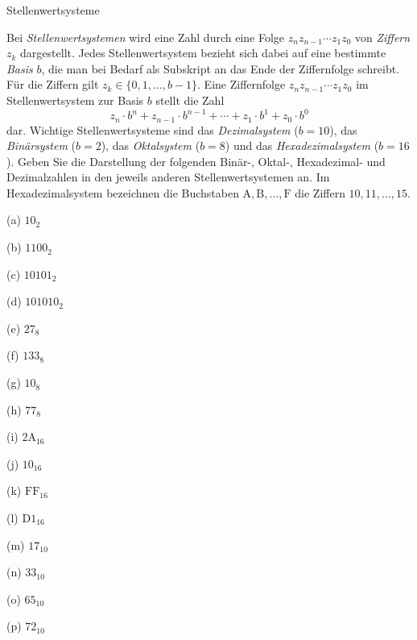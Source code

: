 \begin{frame}[t]%
\medskip

\begin{exercise}{Stellenwertsysteme}
\begin{body}
Bei \emph{Stellenwertsystemen} wird eine Zahl durch eine Folge ${z_n z_{n-1} \dotsb z_1 z_0}$ von \emph{Ziffern} $z_k$ dargestellt. Jedes Stellenwertsystem bezieht sich dabei auf eine bestimmte \emph{Basis} $b$, die man bei Bedarf als Subskript an das Ende der Ziffernfolge schreibt. Für die Ziffern gilt $z_k \in \{0,1,\dotsc,b-1\}$. Eine Ziffernfolge
${z_n z_{n-1} \dotsb z_1 z_0}$ im Stellenwertsystem zur Basis $b$ stellt die Zahl
\[  z_n \cdot b^{n} + z_{n-1} \cdot b^{n-1} + \dotsb + z_1 \cdot b^1 + z_0 \cdot b^0  \]
dar. Wichtige Stellenwertsysteme sind das \emph{Dezimalsystem} ($b = 10$), das \emph{Binärsystem} ($b = 2$), das \emph{Oktalsystem} ($b = 8$) und das \emph{Hexadezimalsystem} ($b = 16$). Geben Sie die Darstellung der folgenden  Binär-, Oktal-, Hexadezimal- und Dezimalzahlen in den jeweils anderen Stellenwertsystemen an. Im Hexadezimalsystem bezeichnen die Buchstaben $\mathrm{A},\mathrm{B}, \dotsc, \mathrm{F}$ die Ziffern $10, 11, \dotsc, 15$.
\begin{center}
\begin{minipage}{0.22\textwidth}
\begin{parts}
\item[(a)] $10_2$
\item[(b)] $1100_2$
\item[(c)] $10101_2$
\item[(d)] $101010_2$
\end{parts}
\end{minipage}
\begin{minipage}{0.22\textwidth}
\begin{parts}
\item[(e)] $27_8$
\item[(f)] $133_8$
\item[(g)] $10_8$
\item[(h)] $77_8$
\end{parts}
\end{minipage}
\begin{minipage}{0.22\textwidth}
\begin{parts}
\item[(i)] $\mathrm{2A}_{16}$
\item[(j)] $10_{16}$
\item[(k)] $\mathrm{FF}_{16}$
\item[(l)] $\mathrm{D1}_{16}$
\end{parts}
\end{minipage}
\begin{minipage}{0.22\textwidth}
\begin{parts}
\item[(m)] $17_{10}$
\item[(n)] $33_{10}$
\item[(o)] $65_{10}$
\item[(p)] $72_{10}$
\end{parts}
\end{minipage}
\end{center}
\end{body}



\end{exercise}
\end{frame}
